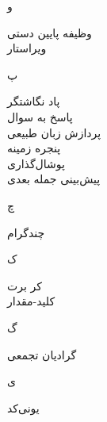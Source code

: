 \begin{center}
و
\end{center}
وظیفه پایین دستی	 \dotfill 	 {} \\ 
ویراستار	 \dotfill 	 {} \\ 
\begin{center}
پ
\end{center}
پاد نگاشتگر	 \dotfill 	 {} \\ 
پاسخ به سوال	 \dotfill 	 {} \\ 
پردازش زبان طبیعی	 \dotfill 	 {} \\ 
پنجره زمینه	 \dotfill 	 {} \\ 
پوشال‌گذاری	 \dotfill 	 {} \\ 
پیش‌بینی جمله بعدی	 \dotfill 	 {} \\ 
\begin{center}
چ
\end{center}
چندگرام	 \dotfill 	 {} \\ 
\begin{center}
ک
\end{center}
کر برت	 \dotfill 	 {} \\ 
کلید-مقدار	 \dotfill 	 {} \\ 
\begin{center}
گ
\end{center}
گرادیان تجمعی	 \dotfill 	 {} \\ 
\begin{center}
ی
\end{center}
یونی‌کد	 \dotfill 	 {} \\ 
